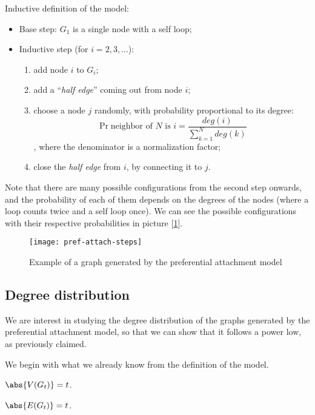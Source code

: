    Inductive definition of the model:
    \begin{itemize}
        \item Base step: $G_1$ is a single node with a self loop;
        \item Inductive step (for $i = 2, 3, \ldots$):
        \begin{enumerate}
            \item add node $i$ to $G_i$;
            \item add a ``\textit{half edge}'' coming out from node $i$;
            \item choose a node $j$ randomly, with probability proportional to its degree:
            \[
                \Pr{\text{neighbor of $N$ is $i$}} = \frac{deg(i)}{\sum_{k=1}^{N} deg(k)}
            \], where the denominator is a normalization factor;
            \item close the \textit{half edge} from $i$, by connecting it to $j$.
        \end{enumerate}
    \end{itemize}
    
    Note that there are many possible configurations from the second step onwards, and the probability of each of them depends on the degrees of the nodes (where a loop counts twice and a self loop once). We can see the possible configurations with their respective probabilities in picture [\ref{fig:pref-att-steps}].
    
    \begin{figure}[h!]
        \centering
        \texttt{[image: pref-attach-steps]}
        \caption{Example of a graph generated by the preferential attachment model}
        \label{fig:pref-att-steps}
    \end{figure}


\subsection{Degree distribution}\label{sec:pref-attach-degree}

    We are interest in studying the degree distribution of the graphs generated by the preferential attachment model, so that we can show that it follows a power low, as previously claimed.
    
    We begin with what we already know from the definition of the model.
    
    \obs $\abs{V(G_t)} = t$.
    
    \obs $\abs{E(G_t)} = t$.
    
